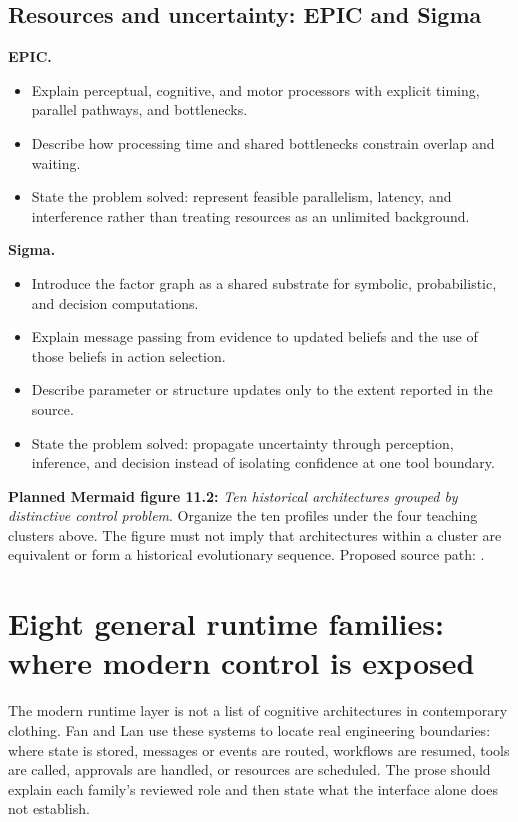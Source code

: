 \subsection{Resources and uncertainty: EPIC and Sigma}
\textbf{EPIC.}
\begin{itemize}
  \item Explain perceptual, cognitive, and motor processors with explicit timing, parallel pathways, and bottlenecks.
  \item Describe how processing time and shared bottlenecks constrain overlap and waiting.
  \item State the problem solved: represent feasible parallelism, latency, and interference rather than treating resources as an unlimited background.
\end{itemize}
\textbf{Sigma.}
\begin{itemize}
  \item Introduce the factor graph as a shared substrate for symbolic, probabilistic, and decision computations.
  \item Explain message passing from evidence to updated beliefs and the use of those beliefs in action selection.
  \item Describe parameter or structure updates only to the extent reported in the source.
  \item State the problem solved: propagate uncertainty through perception, inference, and decision instead of isolating confidence at one tool boundary.
\end{itemize}

\textbf{Planned Mermaid figure 11.2:} \emph{Ten historical architectures grouped by distinctive control problem}. Organize the ten profiles under the four teaching clusters above. The figure must not imply that architectures within a cluster are equivalent or form a historical evolutionary sequence. Proposed source path: .

\section{Eight general runtime families: where modern control is exposed}
The modern runtime layer is not a list of cognitive architectures in contemporary clothing. Fan and Lan use these systems to locate real engineering boundaries: where state is stored, messages or events are routed, workflows are resumed, tools are called, approvals are handled, or resources are scheduled. The prose should explain each family's reviewed role and then state what the interface alone does not establish.

